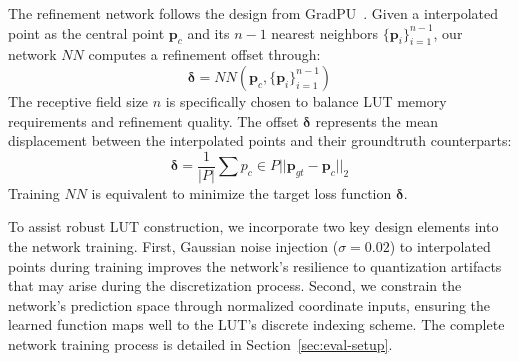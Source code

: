 The refinement network follows the design from GradPU~\cite{he_grad-pu_2023}. Given a interpolated point as the central point $\mathbf{p}_c$ and its $n-1$ nearest neighbors $\{\mathbf{p}_i\}_{i=1}^{n-1}$, our network $\textit{NN}$ computes a refinement offset through:
\begin{equation}
    \boldsymbol{\delta} = \textit{NN}(\mathbf{p}_c, \{\mathbf{p}_i\}_{i=1}^{n-1})
\end{equation}
The receptive field size $n$ is specifically chosen to balance LUT memory requirements and refinement quality. The offset $\boldsymbol{\delta}$ represents the mean displacement between the interpolated points and their groundtruth counterparts:
\begin{equation}
\boldsymbol{\delta} = \frac{1}{|P|}\sum{p_c \in P} ||\mathbf{p}_{gt} - \mathbf{p}_c||_2
\end{equation}
Training $\textit{NN}$ is equivalent to minimize the target loss function  $\boldsymbol{\delta}$.

To assist robust LUT construction, we incorporate two key design elements into the network training. First, Gaussian noise injection ($\sigma = 0.02$) to interpolated points during training improves the network's resilience to quantization artifacts that may arise during the discretization process. Second, we constrain the network's prediction space through normalized coordinate inputs, ensuring the learned function maps well to the LUT's discrete indexing scheme. The complete network training process is detailed in Section~\ref{sec:eval-setup}.


